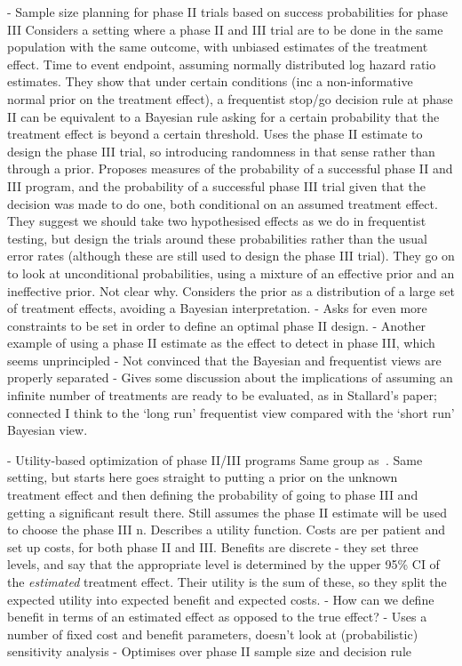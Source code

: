 \documentclass{article} %
\begin{document}
\cite{Goette2015} - Sample size planning for phase {II} trials based on success probabilities for phase {III}
Considers a setting where a phase II and III trial are to be done in the same population with the same outcome, with unbiased estimates of the treatment effect. Time to event endpoint, assuming normally distributed log hazard ratio estimates. They show that under certain conditions (inc a non-informative normal prior on the treatment effect), a frequentist stop/go decision rule at phase II can be equivalent to a Bayesian rule asking for a certain probability that the treatment effect is beyond a certain threshold. Uses the phase II estimate to design the phase III trial, so introducing randomness in that sense rather than through a prior. Proposes measures of the probability of a successful phase II and III program, and the probability of a successful phase III trial given that the decision was made to do one, both conditional on an assumed treatment effect. They suggest we should take two hypothesised effects as we do in frequentist testing, but design the trials around these probabilities rather than the usual error rates (although these are still used to design the phase III trial). They go on to look at unconditional probabilities, using a mixture of an effective prior and an ineffective prior. Not clear why. Considers the prior as a distribution of a large set of treatment effects, avoiding a Bayesian interpretation.
- Asks for even more constraints to be set in order to define an optimal phase II design.
- Another example of using a phase II estimate as the effect to detect in phase III, which seems unprincipled
- Not convinced that the Bayesian and frequentist views are properly separated
- Gives some discussion about the implications of assuming an infinite number of treatments are ready to be evaluated, as in Stallard's paper; connected I think to the `long run' frequentist view compared with the `short run' Bayesian view.

\cite{Kirchner2015} - Utility-based optimization of phase {II}/{III} programs
Same group as~\cite{Goette2015}. Same setting, but starts here goes straight to putting a prior on the unknown treatment effect and then defining the probability of going to phase III and getting a significant result there. Still assumes the phase II estimate will be used to choose the phase III n. Describes a utility function. Costs are per patient and set up costs, for both phase II and III. Benefits are discrete - they set three levels, and say that the appropriate level is determined by the upper 95\% CI of the \emph{estimated} treatment effect. Their utility is the sum of these, so they split the expected utility into expected benefit and expected costs.
- How can we define benefit in terms of an estimated effect as opposed to the true effect?
- Uses a number of fixed cost and benefit parameters, doesn't look at (probabilistic) sensitivity analysis
- Optimises over phase II sample size and decision rule
\end{document}
